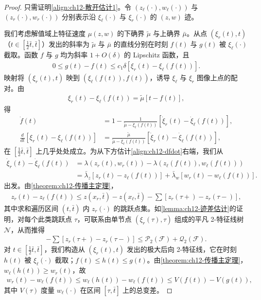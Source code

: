 \documentclass[../../main.tex]{subfiles}
\begin{document}
\begin{proof}
只需证明\eqref{align:ch12-散开估计1}。令 $(z_\ell(\cdot),w_\ell(\cdot))$ 与 $(z_r(\cdot),w_r(\cdot))$ 分别表示沿 $\xi_\ell(\cdot)$ 与 $\xi_r(\cdot)$ 的 $(z,w)$ 迹。

我们考虑解值域上特征速度 $\mu(z,w)$ 的下确界 $\tilde\mu$ 与上确界 $\bar\mu$。从点 $(\xi_r(t),t)$（$t\in[\frac12\bar t,\bar t]$）发出的斜率为 $\tilde\mu$ 与 $\bar\mu$ 的直线分别在时刻 $f(t)$ 与 $g(t)$ 被 $\xi_\ell(\cdot)$ 截取。函数 $f$ 与 $g$ 均为斜率 $1+O(\delta)$ 的 Lipschitz 函数，且
\begin{align}
0\leqslant g(t)-f(t)\leqslant c_1\delta[\xi_r(t)-\xi_\ell(f(t))].
\label{align:ch12-fg}
\end{align}
映射将 $(\xi_r(t),t)$ 映到 $(\xi_\ell(f(t)),f(t))$，诱导 $\xi_\ell$ 与 $\xi_r$ 图像上点的配对。由
\begin{align}
\xi_r(t)-\xi_\ell(f(t))=\tilde\mu[t-f(t)],
\label{align:ch12-配对}
\end{align}
得
\begin{align}
\dot f(t)&=1-\frac{1}{\tilde\mu-\dot\xi_\ell(f(t))}[\dot\xi_r(t)-\dot\xi_\ell(f(t))],
\label{align:ch12-fdot}\\
\frac{d}{dt}[\xi_r(t)-\xi_\ell(f(t))]&=\frac{\tilde\mu}{\tilde\mu-\dot\xi_\ell(f(t))}[\dot\xi_r(t)-\dot\xi_\ell(f(t))],
\label{align:ch12-dfdot}
\end{align}
在 $[\frac12\bar t,\bar t]$ 上几乎处处成立。为从下方估计\eqref{align:ch12-dfdot}右端，我们从
\begin{align}
\dot\xi_r(t)-\dot\xi_\ell(f(t))&=\lambda(z_r(t),w_r(t))-\lambda(z_\ell(f(t)),w_\ell(f(t)))\nonumber\\
&=\bar\lambda_z[z_r(t)-z_\ell(f(t))]+\bar\lambda_w[w_r(t)-w_\ell(f(t))].
\label{align:ch12-速度差}
\end{align}
出发。由\cref{theorem:ch12-传播主定理}，
\begin{align}
z_r(t)-z_\ell(f(t))\leqslant z(x_r,\bar t)-z(x_\ell,\bar t)-\sum[z_r(\tau+)-z_r(\tau-)],
\label{align:ch12-z差-s06}
\end{align}
其中求和遍历区间 $(t,\bar t)$ 内 $z_r(\cdot)$ 的跳跃点集。如\cref{lemma:ch12-迹差估计}的证明，对每个此类跳跃点 $\tau$，可联系由单节点 $(\xi_r(\tau),\tau)$ 组成的平凡 2-特征线树 $\mathscr{N}$，从而推得
\begin{align}
-\sum[z_r(\tau+)-z_r(\tau-)]\leqslant\mathscr{P}_2(\mathscr{F})+\mathscr{Q}_2(\mathscr{F}).
\label{align:ch12-z跳跃}
\end{align}
对 $t\in[\frac12\bar t,\bar t]$，我们构造从 $(\xi_r(t),t)$ 发出的极大后向 2-特征线，它在时刻 $h(t)$ 被 $\xi_\ell(\cdot)$ 截取；$f(t)\leqslant h(t)\leqslant g(t)$。由\cref{theorem:ch12-传播主定理}，$w_\ell(h(t))\geqslant w_r(t)$，故
\begin{align}
w_r(t)-w_\ell(f(t))\leqslant w_\ell(h(t))-w_\ell(f(t))\leqslant V(f(t))-V(g(t)),
\label{align:ch12-w差}
\end{align}
其中 $V(\tau)$ 度量 $w_\ell(\cdot)$ 在区间 $[\tau,\bar t]$ 上的总变差。


\end{proof}
\end{document}
